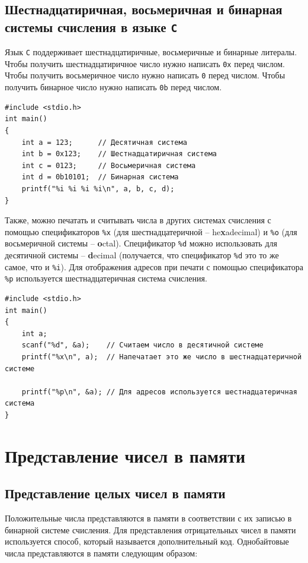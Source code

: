 \documentclass{article}
\begin{document}
\subsection*{Шестнадцатиричная, восьмеричная и бинарная системы счисления в языке \texttt{C}}
Язык \texttt{C} поддерживает шестнадцатиричные, восьмеричные и бинарные литералы. Чтобы получить шестнадцатиричное число нужно написать \texttt{0x} перед числом. Чтобы получить восьмеричное число нужно написать \texttt{0} перед числом. Чтобы получить бинарное число нужно написать \texttt{0b} перед числом. 
\begin{lstlisting}
#include <stdio.h>
int main() 
{
    int a = 123;      // Десятичная система
    int b = 0x123;    // Шестнадцатиричная система
    int c = 0123;     // Восьмеричная система
    int d = 0b10101;  // Бинарная система
    printf("%i %i %i %i\n", a, b, c, d);
}
\end{lstlisting}
Также, можно печатать и считывать числа в других системах счисления с помощью спецификаторов \texttt{\%x} (для шестнадцатеричной -- he\textbf{x}adecimal) и \texttt{\%o} (для восьмеричной системы -- \textbf{o}ctal). Спецификатор \texttt{\%d} можно использовать для десятичной системы -- \textbf{d}ecimal (получается, что спецификатор \texttt{\%d} это то же самое, что и \texttt{\%i}). Для отображения адресов при печати с помощью спецификатора \texttt{\%p} используется шестнадцатеричная система счисления.
\begin{lstlisting}
#include <stdio.h>
int main() 
{
    int a;
    scanf("%d", &a);    // Считаем число в десятичной системе
    printf("%x\n", a);  // Напечатает это же число в шестнадцатеричной системе
    
    printf("%p\n", &a); // Для адресов используется шестнадцатеричная система
}
\end{lstlisting}


\section*{Представление чисел в памяти}

\subsection*{Представление целых чисел в памяти}
Положительные числа представляются в памяти в соответствии с их записью в бинарной системе счисления. Для представления отрицательных чисел в памяти используется способ, который называется дополнительный код. Однобайтовые числа представляются в памяти следующим образом:\\
\end{document}
